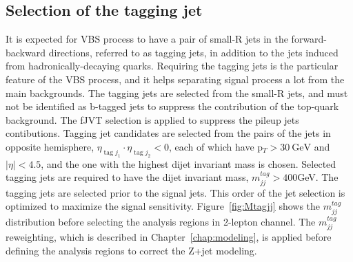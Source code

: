 \subsection{Selection of the tagging jet}
It is expected for VBS process to have a pair of small-R jets in the forward-backward directions, referred to as tagging jets, in addition to the jets induced from hadronically-decaying quarks.
Requiring the tagging jets is the particular feature of the VBS process, and it helps separating signal process a lot from the main backgrounds.
The tagging jets are selected from the small-R jets, and must not be identified as b-tagged jets to suppress the contribution of the top-quark background. 
The fJVT selection is applied to suppress the pileup jets contibutions. Tagging jet candidates are selected from the pairs of the jets in opposite hemisphere, $\eta_{\operatorname{tag} j_{1}} \cdot \eta_{\operatorname{tag} j_{2}}<0$, each of which have p$_T > 30~\mathrm{GeV}$ and $|\eta| < 4.5$, and the one with the highest dijet invariant mass is chosen.  
Selected tagging jets are required to have the dijet invariant mass, $m^{tag}_{jj} > 400$GeV.
The tagging jets are selected prior to the signal jets. This order of the jet selection is optimized to maximize the signal sensitivity.
Figure~\ref{fig:Mtagjj} shows the $m^{tag}_{jj}$ distribution before selecting the analysis regions in 2-lepton channel.
The $m^{tag}_{jj}$ reweighting, which is described in Chapter~\ref{chap:modeling}, is applied before defining the analysis regions to correct the Z+jet modeling.
